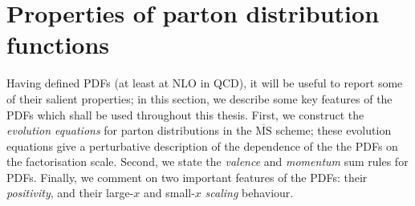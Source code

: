 \documentclass[withindex,glossary]{cam-thesis}
\begin{document}
\section{Properties of parton distribution functions}
\label{sec:pdfproperties}
Having defined PDFs (at least at NLO in QCD), it will be useful to report some of their salient properties; in this section, we describe some key features of the PDFs which shall be used throughout this thesis. First, we construct the \textit{evolution equations} for parton distributions in the $\overline{\text{MS}}$ scheme; these evolution equations give a perturbative description of the dependence of the the PDFs on the factorisation scale. Second, we state the \textit{valence} and \textit{momentum} sum rules for PDFs. Finally, we comment on two important features of the PDFs: their \textit{positivity}, and their large-$x$ and small-$x$ \textit{scaling} behaviour.
\end{document}
